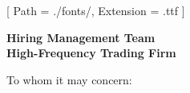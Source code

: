 


\renewcommand{\photo}[2]{}

\geometry{
  left=2cm,
  right=2cm,
  top=2cm,
  bottom=2cm
}



\makecvheader

\setmainfont{NotoSans-Regular}[
  Path = ./fonts/,
  Extension = .ttf
]

\vspace{1cm}
\indent\textbf{Hiring Management Team}\\
\indent\textbf{High-Frequency Trading Firm}

\vspace{0.5cm}

\noindent To whom it may concern:

\vspace{0.5cm}

